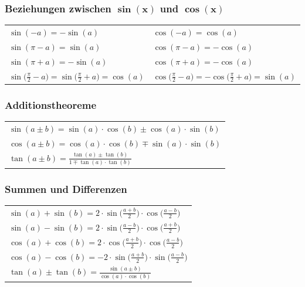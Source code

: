 \subsubsection{Beziehungen zwischen $\bm{\sin(x)}$ und $\bm{\cos(x)}$}\label{chap:trigo-beziehungen}

\renewcommand{\arraystretch}{1.2}
\begin{tabular}{ll}
    $\sin(-a) = -\sin(a)$
                                                                                        & $\cos(-a) = \cos(a)$                                                                  \\
    $\sin(\pi - a) = \sin(a)$
                                                                                        & $\cos(\pi -a) = - \cos(a)$                                                            \\
    $\sin(\pi + a) = -\sin(a)$
                                                                                        & $\cos(\pi + a) = - \cos(a)$                                                           \\
    $\sin \Big( \frac{\pi}{2} - a \Big) = \sin \Big( \frac{\pi}{2} + a \Big) = \cos(a)$ & $\cos \Big( \frac{\pi}{2} - a \Big) = - \cos \Big( \frac{\pi}{2} + a \Big) = \sin(a)$
\end{tabular}
\renewcommand{\arraystretch}{1}


\subsubsection{Additionstheoreme}

\renewcommand{\arraystretch}{1.2}
\begin{tabular}{l}
    $\sin(a \pm b) = \sin(a) \cdot \cos(b) \pm \cos(a) \cdot \sin(b)$  \\
    $\cos(a \pm b) = \cos(a) \cdot \cos(b) \mp \sin(a) \cdot \sin(b) $ \\
    $\tan(a \pm b) = \frac{\tan(a) \pm \tan(b)}{1 \mp \tan(a) \cdot \tan(b)}$
\end{tabular}
\renewcommand{\arraystretch}{1}


\subsubsection{Summen und Differenzen}

\renewcommand{\arraystretch}{1.2}
\begin{tabular}{l}
    $\sin(a) + \sin(b) = 2 \cdot \sin \Big( \frac{a+b}{2} \Big) \cdot \cos \Big( \frac{a-b}{2} \Big)$  \\
    $\sin(a) - \sin(b) = 2 \cdot \sin \Big( \frac{a-b}{2} \Big) \cdot \cos \Big( \frac{a+b}{2} \Big)$  \\
    $\cos(a) + \cos(b) = 2 \cdot \cos \Big( \frac{a+b}{2} \Big) \cdot \cos \Big( \frac{a-b}{2} \Big)$  \\
    $\cos(a) - \cos(b) = -2 \cdot \sin \Big( \frac{a+b}{2} \Big) \cdot \sin \Big( \frac{a-b}{2} \Big)$ \\
    $\tan(a) \pm \tan(b) = \frac{\sin(a \pm b)}{\cos(a) \cdot \cos(b)}$
\end{tabular}
\renewcommand{\arraystretch}{1}


